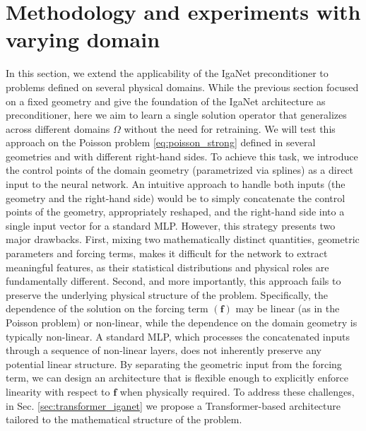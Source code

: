 \documentclass{article}
\theoremstyle{plain}
\numberwithin{equation}{section}
\begin{document}
\section{Methodology and experiments with varying domain}\label{sec:experiments_rhs_domain}
In this section, we extend the applicability of the IgaNet preconditioner to problems defined on several physical domains.
While the previous section focused on a fixed geometry and give the foundation of the IgaNet architecture as preconditioner, here we aim to learn a single solution operator that generalizes across different domains $\Omega$ without the need for retraining.
We will test this approach on the Poisson problem \eqref{eq:poisson_strong} defined in several geometries and with different right-hand sides. To achieve this task, we introduce the control points of the domain geometry (parametrized via splines) as a direct input to the neural network. An intuitive approach to handle both inputs (the geometry and the right-hand side) would be to simply concatenate the control points of the geometry, appropriately reshaped,  and the right-hand side into a single input vector for a standard MLP. However, this strategy presents two major drawbacks. First, mixing two mathematically distinct quantities, geometric parameters and forcing terms, makes it difficult for the network to extract meaningful features, as their statistical distributions and physical roles are fundamentally different.
Second, and more importantly, this approach fails to preserve the underlying physical structure of the problem. Specifically, the dependence of the solution on the forcing term $(\mathbf{f})$ may be linear (as in the Poisson problem) or non-linear, while the dependence on the domain geometry  is typically non-linear. A standard MLP, which processes the concatenated inputs through a sequence of non-linear layers, does not inherently preserve any potential linear structure. By separating the geometric input from the forcing term, we can design an architecture that is flexible enough to explicitly enforce linearity with respect to $\mathbf{f}$ when physically required. To address these challenges, in Sec. \ref{sec:transformer_iganet} we propose a Transformer-based architecture \cite{vaswani2017attention} tailored to the mathematical structure of the problem.

\end{document}
